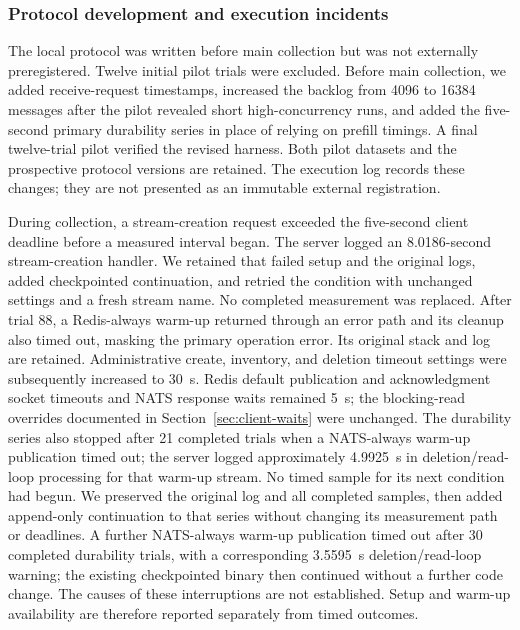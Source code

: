 \subsubsection{Protocol development and execution incidents}

The local protocol was written before main collection but was not externally preregistered. Twelve initial pilot trials were excluded. Before main collection, we added receive-request timestamps, increased the backlog from 4096 to 16384 messages after the pilot revealed short high-concurrency runs, and added the five-second primary durability series in place of relying on prefill timings. A final twelve-trial pilot verified the revised harness. Both pilot datasets and the prospective protocol versions are retained. The execution log records these changes; they are not presented as an immutable external registration.

During collection, a stream-creation request exceeded the five-second client deadline before a measured interval began. The server logged an 8.0186-second stream-creation handler. We retained that failed setup and the original logs, added checkpointed continuation, and retried the condition with unchanged settings and a fresh stream name. No completed measurement was replaced. After trial 88, a Redis-always warm-up returned through an error path and its cleanup also timed out, masking the primary operation error. Its original stack and log are retained. Administrative create, inventory, and deletion timeout settings were subsequently increased to 30~s. Redis default publication and acknowledgment socket timeouts and NATS response waits remained 5~s; the blocking-read overrides documented in Section~\ref{sec:client-waits} were unchanged. The durability series also stopped after 21 completed trials when a NATS-always warm-up publication timed out; the server logged approximately 4.9925~s in deletion/read-loop processing for that warm-up stream. No timed sample for its next condition had begun. We preserved the original log and all completed samples, then added append-only continuation to that series without changing its measurement path or deadlines. A further NATS-always warm-up publication timed out after 30 completed durability trials, with a corresponding 3.5595~s deletion/read-loop warning; the existing checkpointed binary then continued without a further code change. The causes of these interruptions are not established. Setup and warm-up availability are therefore reported separately from timed outcomes.

